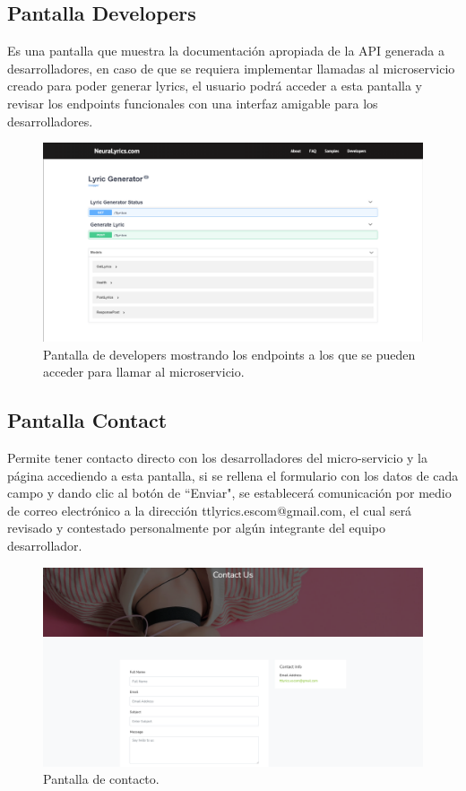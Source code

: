 \documentclass[12pt, a4paper, titlepage]{report}
\begin{document}
\subsection{Pantalla Developers}
Es una pantalla que muestra la documentación apropiada de la API generada a desarrolladores, en caso de que se requiera implementar llamadas al microservicio creado para poder generar lyrics, el usuario podrá acceder a esta pantalla y revisar los endpoints funcionales con una interfaz amigable para los desarrolladores.

\begin{figure}[H] 
	\includegraphics[width=13.5cm]{./imagenes/Pruebas/pdev.png}
	\centering \caption{Pantalla de developers mostrando los endpoints a los que se pueden acceder para llamar al microservicio.}
\end{figure}

\subsection{Pantalla Contact}
Permite tener contacto directo con los desarrolladores del micro-servicio y la página accediendo a esta pantalla, si se rellena el formulario con los datos de cada campo y dando clic al botón de “Enviar", se establecerá comunicación por medio de correo electrónico a la dirección ttlyrics.escom@gmail.com, el cual será revisado y contestado personalmente por algún integrante del equipo desarrollador.

\begin{figure}[H] 
	\includegraphics[width=13.5cm]{./imagenes/Pruebas/pcontact.png}
	\centering \caption{Pantalla de contacto.}
\end{figure}
\end{document}
